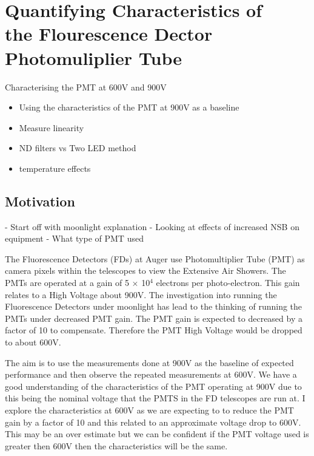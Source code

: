 \chapter[Quantifying Characteristics of the FD PMT]{\centering Quantifying Characteristics of \\ the Flourescence Dector \\ Photomuliplier Tube \\}\label{Ch:PMTCharacter}

Characterising the PMT at 600V and 900V
\begin{itemize}
\item Using the characteristics of the PMT at 900V as a baseline
\item Measure linearity
\item ND filters vs Two LED method
\item temperature effects
\end{itemize}

\section{Motivation}

- Start off with moonlight explanation
- Looking at effects of increased NSB on equipment
- What type of PMT used

The Fluorescence Detectors (FDs) at Auger use Photomultiplier Tube (PMT) as camera pixels within the telescopes to view the Extensive Air Showers. The PMTs are operated at a gain of 5 $\times$ 10$^4$ electrons per photo-electron. This gain relates to a High Voltage about 900V. The investigation into running the Fluorescence Detectors under moonlight has lead to the thinking of running the PMTs under decreased PMT gain. The PMT gain is expected to decreased by a factor of 10 to compensate. Therefore the PMT High Voltage would be dropped to about 600V.

The aim is to use the measurements done at 900V as the baseline of expected performance and then observe the repeated measurements at 600V. We have a good  understanding of the characteristics of the PMT operating at 900V due to this being the nominal voltage that the PMTS in the FD telescopes are run at. I explore the characteristics at 600V as we are expecting to to reduce the PMT gain by a factor of 10 and this related to an approximate voltage drop to 600V. This may be an over estimate but we can be confident if the PMT voltage used is greater then 600V then the characteristics will be the same.

